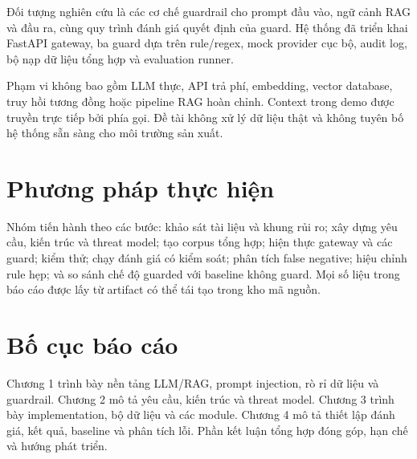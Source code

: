 Đối tượng nghiên cứu là các cơ chế guardrail cho prompt đầu vào, ngữ cảnh RAG
và đầu ra, cùng quy trình đánh giá quyết định của guard. Hệ thống đã triển khai
FastAPI gateway, ba guard dựa trên rule/regex, mock provider cục bộ, audit log,
bộ nạp dữ liệu tổng hợp và evaluation runner.

Phạm vi không bao gồm LLM thực, API trả phí, embedding, vector database, truy
hồi tương đồng hoặc pipeline RAG hoàn chỉnh. Context trong demo được truyền trực
tiếp bởi phía gọi. Đề tài không xử lý dữ liệu thật và không tuyên bố hệ thống
sẵn sàng cho môi trường sản xuất.

\section*{Phương pháp thực hiện}

Nhóm tiến hành theo các bước: khảo sát tài liệu và khung rủi ro; xây dựng yêu
cầu, kiến trúc và threat model; tạo corpus tổng hợp; hiện thực gateway và các
guard; kiểm thử; chạy đánh giá có kiểm soát; phân tích false negative; hiệu chỉnh
rule hẹp; và so sánh chế độ guarded với baseline không guard. Mọi số liệu trong
báo cáo được lấy từ artifact có thể tái tạo trong kho mã nguồn.

\section*{Bố cục báo cáo}

Chương 1 trình bày nền tảng LLM/RAG, prompt injection, rò rỉ dữ liệu và
guardrail. Chương 2 mô tả yêu cầu, kiến trúc và threat model. Chương 3 trình bày
implementation, bộ dữ liệu và các module. Chương 4 mô tả thiết lập đánh giá,
kết quả, baseline và phân tích lỗi. Phần kết luận tổng hợp đóng góp, hạn chế và
hướng phát triển.
